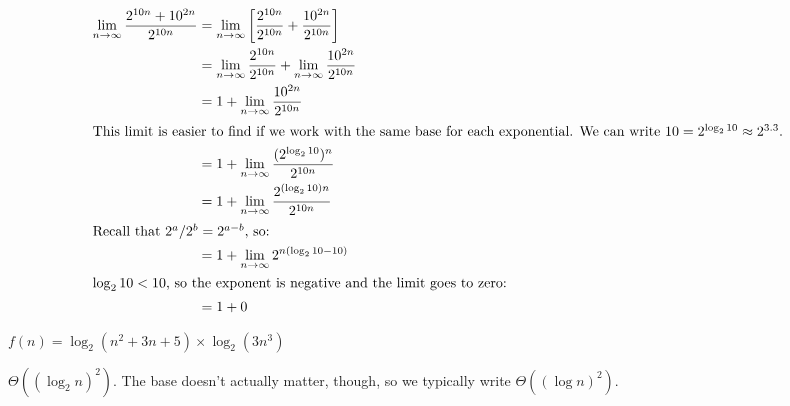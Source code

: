 \begin{prob}
\begin{subprobset}
\begin{subprob}
\begin{soln}
                \begin{align*}
                    \lim_{n \to \infty} \frac{2^{10n} + 10^{2n}}{2^{10n}}
                    &=
                    \lim_{n \to \infty} \left[\frac{2^{10n}}{2^{10n}} + \frac{10^{2n}}{2^{10n}}\right]
                    \\
                    &=
                    \lim_{n \to \infty} \frac{2^{10n}}{2^{10n}} + \lim_{n \to \infty} \frac{10^{2n}}{2^{10n}}
                    \\
                    &=
                    1 + \lim_{n \to \infty} \frac{10^{2n}}{2^{10n}}
                    \\
                \intertext{This limit is easier to find if we work with the same base for each exponential.
                We can write $10 = 2^{\log_2 10} \approx 2^{3.3}$.}
                    &=
                    1 + \lim_{n \to \infty} \frac{(2^{\log_2 10})^n}{2^{10n}}
                    \\
                    &=
                    1 + \lim_{n \to \infty} \frac{2^{(\log_2 10)n}}{2^{10n}}
                    \\
                    \intertext{Recall that $2^a/2^b = 2^{a - b }$, so:}
                    &=
                    1 + \lim_{n \to \infty} 2^{n(\log_2 10 - 10)}
                    \\
                    \intertext{$\log_2 10 < 10$, so the exponent is negative and the limit goes to zero:}
                    &=
                    1 + 0
                    \\
                \end{align*}
            \end{soln}
        \end{subprob}


        \begin{subprob}
            $f(n) = \log_2(n^2 + 3n + 5) \times \log_2(3n^3)$

            \begin{soln}
                $\Theta((\log_2 n)^2)$. The base doesn't actually matter, though, so
                we typically write $\Theta((\log n)^2)$.
            \end{soln}
        \end{subprob}

    \end{subprobset}
\end{prob}
